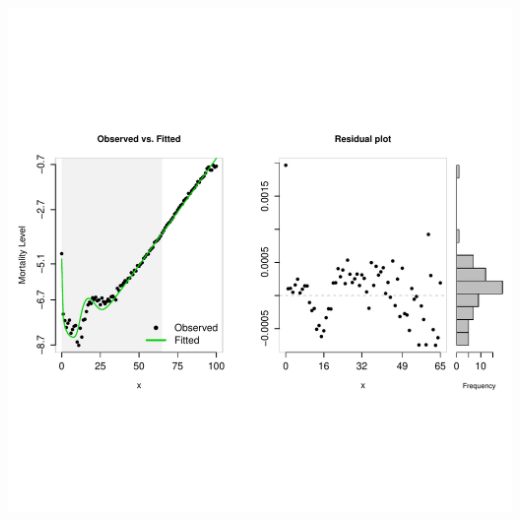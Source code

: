 \documentclass[a0,portrait]{a0poster}\usepackage[]{graphicx}\usepackage[]{color}
\newenvironment{knitrout}{}{} %
\begin{document}
\begin{table}
\vspace{-5cm}
\begin{knitrout}
\color{fgcolor}
\includegraphics[width=1\linewidth]{figure/unnamed-chunk-3-1} 

\end{knitrout}
\end{table} 
\end{document}

